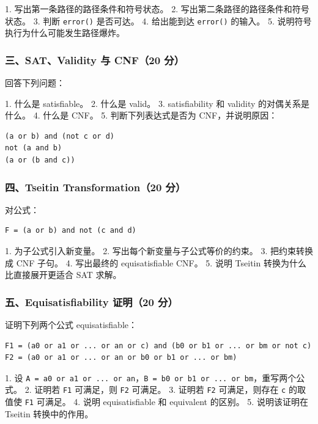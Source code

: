 \documentclass[UTF8]{ctexart}
\begin{document}
1. 写出第一条路径的路径条件和符号状态。 2. 写出第二条路径的路径条件和符号状态。 3. 判断 \texttt{error()} 是否可达。 4. 给出能到达 \texttt{error()} 的输入。 5. 说明符号执行为什么可能发生路径爆炸。

\subsubsection*{三、SAT、Validity 与 CNF（20 分）}

回答下列问题：

1. 什么是 satisfiable。 2. 什么是 valid。 3. satisfiability 和 validity 的对偶关系是什么。 4. 什么是 CNF。 5. 判断下列表达式是否为 CNF，并说明原因：

\begin{Verbatim}[fontsize=\small,breaklines=true]
(a or b) and (not c or d)
not (a and b)
(a or (b and c))
\end{Verbatim}

\subsubsection*{四、Tseitin Transformation（20 分）}

对公式：

\begin{Verbatim}[fontsize=\small,breaklines=true]
F = (a or b) and not (c and d)
\end{Verbatim}

1. 为子公式引入新变量。 2. 写出每个新变量与子公式等价的约束。 3. 把约束转换成 CNF 子句。 4. 写出最终的 equisatisfiable CNF。 5. 说明 Tseitin 转换为什么比直接展开更适合 SAT 求解。

\subsubsection*{五、Equisatisfiability 证明（20 分）}

证明下列两个公式 equisatisfiable：

\begin{Verbatim}[fontsize=\small,breaklines=true]
F1 = (a0 or a1 or ... or an or c) and (b0 or b1 or ... or bm or not c)
F2 = (a0 or a1 or ... or an or b0 or b1 or ... or bm)
\end{Verbatim}

1. 设 \texttt{A = a0 or a1 or ... or an}，\texttt{B = b0 or b1 or ... or bm}，重写两个公式。 2. 证明若 \texttt{F1} 可满足，则 \texttt{F2} 可满足。 3. 证明若 \texttt{F2} 可满足，则存在 \texttt{c} 的取值使 \texttt{F1} 可满足。 4. 说明 equisatisfiable 和 equivalent 的区别。 5. 说明该证明在 Tseitin 转换中的作用。
\end{document}
